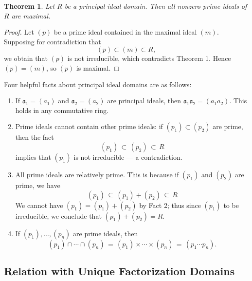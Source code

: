 \documentclass[11pt]{article}
\newtheorem{theorem}{Theorem}
\begin{document}
\begin{adjustwidth}{0.5cm}{}
	\begin{theorem}
		Let $R$ be a principal ideal domain. Then all nonzero prime ideals of $R$ are maximal.
	\end{theorem}
	\begin{proof}
    Let $(p)$ be a prime ideal contained in the maximal ideal $(m)$. Supposing for contradiction that
    \[
      (p) \subset (m) \subset R,
    \]
    we obtain that $(p)$ is not irreducible, which contradicts Theorem 1. Hence $(p) = (m)$, so $(p)$ is maximal.
	\end{proof}
\end{adjustwidth}
Four helpful facts about principal ideal domains are as follows:
\begin{enumerate}
  \item If $\mathfrak{a}_{1} = (a_{1})$ and $\mathfrak{a}_{2} = (a_{2})$ are principal ideals, then $\mathfrak{a}_{1} \mathfrak{a}_{2} = (a_{1}a_{2})$. This holds in any commutative ring.
  \item Prime ideals cannot contain other prime ideals: if $(p_{1}) \subset (p_{2})$ are prime, then the fact
  \[
    (p_{1}) \, \subset \, (p_{2}) \, \subset \, R
  \]
  implies that $(p_{1})$ is not irreducible --- a contradiction.
  \item All prime ideals are relatively prime. This is because if $(p_{1})$ and $(p_{2})$ are prime, we have
  \[
    (p_{1}) \, \subseteq \, (p_{1}) + (p_{2}) \, \subseteq \, R
  \]
  We cannot have $(p_{1}) = (p_{1}) + (p_{2})$ by Fact 2; thus since $(p_{1})$ to be irreducible, we conclude that $(p_{1}) + (p_{2}) = R$.
  \item If $(p_{1}), \ldots, (p_{n})$ are prime ideals, then
  \[
    (p_{1}) \cap \cdots \cap (p_{n}) \, = \, (p_{1}) \times \cdots \times (p_{n}) \, = \, (p_{1} \cdots p_{n}).
  \]
\end{enumerate}


\subsection{Relation with Unique Factorization Domains}
\end{document}
